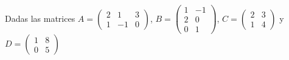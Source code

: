 \documentclass[addpoints,spanish, 12pt,a4paper]{exam}
\begin{document}
\begin{questions}
\question Dadas las matrices  $A=\left(\begin{matrix}2 & 1 & 3\\1 & -1 & 0\end{matrix}\right)$,  $B=\left(\begin{matrix}1 & -1\\2 & 0\\0 & 1\end{matrix}\right)$, $C=\left(\begin{matrix}2 & 3\\1 & 4\end{matrix}\right)$ y $D=\left(\begin{matrix}1 & 8\\0 & 5\end{matrix}\right)$ 

\end{questions}
\end{document}
